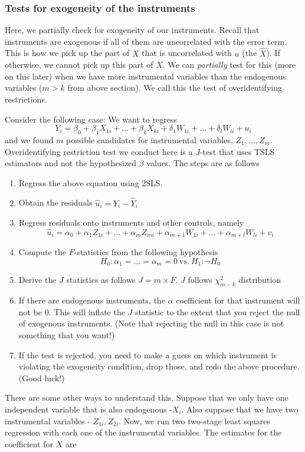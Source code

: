 \documentclass[12pt]{article}
\theoremstyle{definition}
\theoremstyle{property}
\theoremstyle{assumption}
\theoremstyle{example}
\theoremstyle{comment}
\begin{document}
\subsubsection{Tests for exogeneity of the instruments}
Here, we partially check for exogeneity of our instruments. Recall that instruments are exogenous if all of them are uncorrelated with the error term. This is how we pick up the part of $X$ that is uncorrelated with $u$ (the $\widehat{X}$). If otherwise, we cannot pick up this part of $X$. We can \textit{partially} test for this (more on this later) when we have more instrumental variables than the endogenous variables ($m>k$ from above section). We call this the test of overidentifying restrictions.
\par
Consider the following case: We want to regress
\[
Y_i = \beta_0 + \beta_1X_{1i} +...+ \beta_kX_{ki} + \delta_1W_{1i}+...+\delta_lW_{li}+u_i 
\]
and we found $m$ possible candidates for instrumental variables, $Z_1,...,Z_m$. Overidentifying restriction test we conduct here is a $J$-test that uses TSLS estimators and not the hypothesized $\beta$ values. The steps are as follows
\begin{enumerate}
\item Regress the above equation using 2SLS.
\item Obtain the residuals $\hat{u}_i=Y_i-\widehat{Y}_i$
\item Regress residuals onto instruments and other controls, namely
\[
\hat{u}_i = \alpha_0 + \alpha_1 Z_{1i}+ ... + \alpha_m Z_{mi} + \alpha_{m+1}W_{1i}+ ... + \alpha_{m+l}W_{li}+v_i
\]
\item Compute the $F$-statistics from the following hypothesis
\[
H_0: \alpha_1 = ... = \alpha_m=0\ \text{vs.} \ H_1: \lnot H_0
\]
\item Derive the $J$ statistics as follows $J = m\times F$. $J$ follows $\chi^2_{m-k}$ distribution 
\item If there are endogenous instruments, the $\alpha$ coefficient for that instrument will not be 0. This will inflate the $J$ statistic to the extent that you reject the null of exogenous instruments. (Note that rejecting the null in this case is not something that you want!)
\item If the test is rejected, you need to make a guess on which instrument is violating the exogeneity condition, drop those, and redo the above procedure. (Good luck!)
\end{enumerate}
There are some other ways to understand this. Suppose that we only have one independent variable that is also endogenous  -$X_i$. Also suppose that we have two instrumental variables - $Z_{1i}, Z_{2i}$. Now, we run two two-stage least squares regression with each one of the instrumental variables. The estimates for the coefficient for $X$ are 
\end{document}
